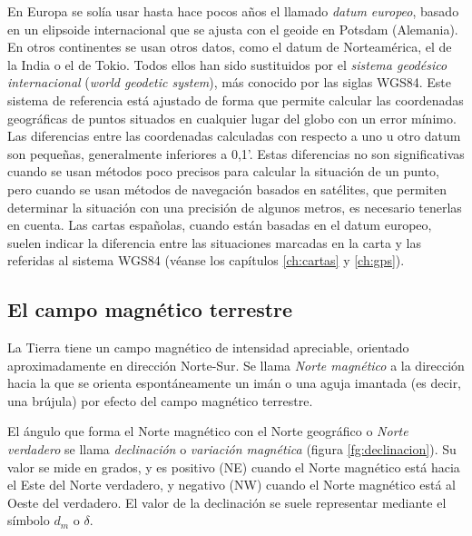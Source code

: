 En Europa se solía usar hasta hace pocos años el llamado \emph{datum europeo}, basado en un elipsoide internacional que se ajusta con el geoide en Potsdam (Alemania). En otros continentes se usan otros datos, como el datum de Norteamérica, el de la India o el de Tokio. Todos ellos han sido sustituidos por el \emph{ sistema geodésico internacional} (\emph{world geodetic system}), más conocido por las siglas WGS84. Este sistema de referencia está ajustado de forma que permite calcular las coordenadas geográficas de puntos situados en cualquier lugar del globo con un error mínimo. 
Las diferencias entre las coordenadas calculadas con respecto a uno u otro datum son pequeñas, generalmente inferiores a 0,1’. Estas diferencias no son significativas cuando se usan métodos poco precisos para calcular la situación de un punto, pero cuando se usan métodos de navegación basados en satélites, que permiten determinar la situación con una precisión de algunos metros, es necesario tenerlas en cuenta. Las cartas españolas, cuando están basadas en el datum europeo,  suelen indicar la diferencia entre las situaciones marcadas en la carta y las referidas al sistema WGS84 (véanse los capítulos \ref{ch:cartas} y \ref{ch:gps}). 

\subsection{El campo magnético terrestre}
 



 
La Tierra tiene un campo magnético de intensidad apreciable, orientado aproximadamente en dirección Norte-Sur. Se llama \emph{Norte magnético} a la dirección hacia la que se orienta espontáneamente un imán o una aguja imantada (es decir, una brújula) por efecto del campo magnético terrestre.

El ángulo que forma el Norte magnético con el Norte geográfico o \emph{Norte verdadero} se llama \emph{declinación} o \emph{variación magnética} (figura \ref{fg:declinacion}). Su valor se mide en grados, y es positivo (NE) cuando el Norte magnético está hacia el Este del Norte verdadero, y negativo (NW) cuando el Norte magnético está al Oeste del verdadero. El valor de la declinación se suele representar mediante el símbolo $d_{m}$ o $\delta$. 

